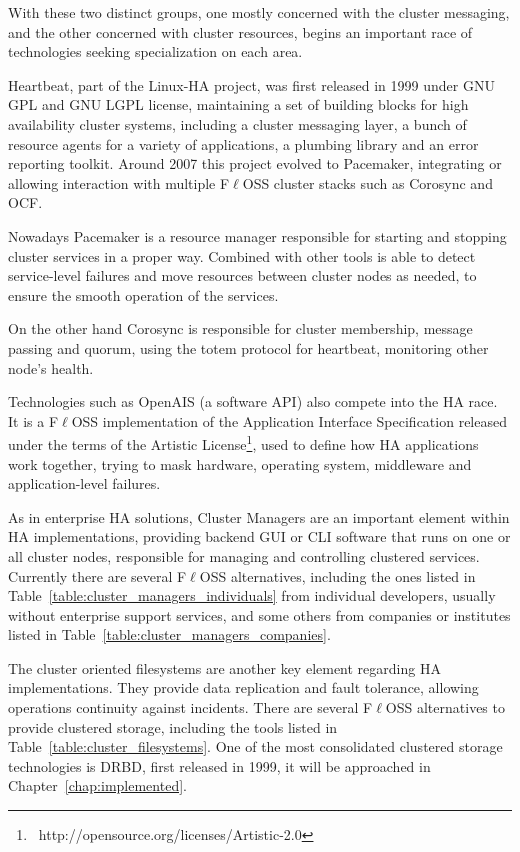 \documentclass[a4paper, 12pt]{book}
\begin{document}
\noindent With these two distinct groups, one mostly concerned with the cluster messaging, and the other concerned with cluster resources, begins an important race of technologies seeking specialization on each area.\bigskip

\noindent Heartbeat, part of the Linux-HA project, was first released in 1999 under GNU GPL and GNU LGPL license, maintaining a set of building blocks for high availability cluster systems, including a cluster messaging layer, a bunch of resource agents for a variety of applications, a plumbing library and an error reporting toolkit. Around 2007 this project evolved to Pacemaker, integrating or allowing interaction with multiple F$\ell$OSS cluster stacks such as Corosync and OCF.\bigskip

\noindent Nowadays Pacemaker is a resource manager responsible for starting and stopping cluster services in a proper way. Combined with other tools is able to detect service-level failures and move resources between cluster nodes as needed, to ensure the smooth operation of the services.\bigskip


\noindent On the other hand Corosync is responsible for cluster membership, message passing and quorum, using the totem protocol 
for heartbeat, monitoring other node's health.

\noindent Technologies such as OpenAIS (a software API) also compete into the HA race. It is a F$\ell$OSS implementation of the Application Interface Specification released under the terms of the Artistic License\footnote{{\tiny\  http://opensource.org/licenses/Artistic-2.0}}, used to define how HA applications work together, trying to mask hardware, operating system, middleware and application-level failures. %

\noindent As in enterprise HA solutions, Cluster Managers are an important element within HA implementations, providing backend GUI or CLI software that runs on one or all cluster nodes, responsible for managing and controlling clustered services. Currently there are several F$\ell$OSS alternatives, including the ones listed in Table~\ref{table:cluster_managers_individuals} from individual developers, usually without enterprise support services, and some others from companies or institutes listed in Table~\ref{table:cluster_managers_companies}.

\noindent The cluster oriented filesystems are another key element regarding HA implementations. They provide data replication and fault tolerance, allowing operations continuity against incidents. There are several F$\ell$OSS alternatives to provide clustered storage, including the tools listed in Table~\ref{table:cluster_filesystems}. One of the most consolidated clustered storage technologies is DRBD, first released in 1999, it will be approached in Chapter~\ref{chap:implemented}.
\end{document}
